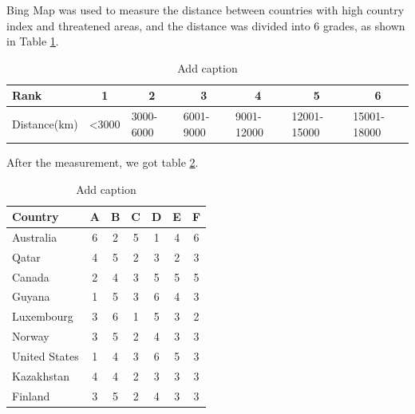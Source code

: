 \documentclass[12pt]{article}  %
\begin{document}
Bing Map was used to measure the distance between countries with high country index and threatened areas, and the distance was divided into 6 grades, as shown in Table \ref{distance_level}.



\begin{table}[htbp]
  \centering
  \caption{Add caption}
    \begin{tabular}{lllllll}
    \toprule
    Rank  & \multicolumn{1}{c}{1} & \multicolumn{1}{c}{2} & \multicolumn{1}{c}{3} & \multicolumn{1}{c}{4} & \multicolumn{1}{c}{5} & \multicolumn{1}{c}{6} \\
    \midrule
    Distance(km) & <3000 & 3000-6000 & 6001-9000 & 9001-12000 & 12001-15000 & 15001-18000 \\
    \bottomrule
    \end{tabular}%
  \label{distance_level}%
\end{table}%



After the measurement, we got table \ref{distance}.



\begin{table}[htbp]
  \centering
  \caption{Add caption}
    \begin{tabular}{lcccccc}
    \toprule
    Country & A     & B     & C     & D     & E     & F \\
    \midrule
    Australia & 6     & 2     & 5     & 1     & 4     & 6 \\
    Qatar & 4     & 5     & 2     & 3     & 2     & 3 \\
    Canada & 2     & 4     & 3     & 5     & 5     & 5 \\
    Guyana & 1     & 5     & 3     & 6     & 4     & 3 \\
    Luxembourg & 3     & 6     & 1     & 5     & 3     & 2 \\
    Norway & 3     & 5     & 2     & 4     & 3     & 3 \\
    United States & 1     & 4     & 3     & 6     & 5     & 3 \\
    Kazakhstan & 4     & 4     & 2     & 3     & 3     & 3 \\
    Finland & 3     & 5     & 2     & 4     & 3     & 3 \\
    \bottomrule
    \end{tabular}%
  \label{distance}%
\end{table}%
\end{document}
